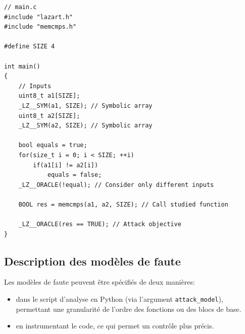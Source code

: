 \begin{lstlisting}   
// main.c
#include "lazart.h"
#include "memcmps.h"

#define SIZE 4

int main()
{  
    // Inputs
    uint8_t a1[SIZE];
    _LZ__SYM(a1, SIZE); // Symbolic array
    uint8_t a2[SIZE];
    _LZ__SYM(a2, SIZE); // Symbolic array
    
    bool equals = true;
    for(size_t i = 0; i < SIZE; ++i)
        if(a1[i] != a2[i])
            equals = false;
    _LZ__ORACLE(!equal); // Consider only different inputs
    
    BOOL res = memcmps(a1, a2, SIZE); // Call studied function

    _LZ__ORACLE(res == TRUE); // Attack objective
}
\end{lstlisting}
        
        \subsection{Description des modèles de faute}
        \label{sec:lazart-am}
        
            Les modèles de faute peuvent être spécifiés de deux manières:
            \begin{itemize}
                \item dans le script d'analyse en Python (via l'argument \texttt{attack\_model}), permettant une granularité de l'ordre des fonctions ou des blocs de base.
                \item en instrumentant le code, ce qui permet un contrôle plus précis.
            \end{itemize}


